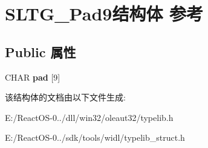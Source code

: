 \hypertarget{struct_s_l_t_g___pad9}{}\section{S\+L\+T\+G\+\_\+\+Pad9结构体 参考}
\label{struct_s_l_t_g___pad9}
\subsection*{Public 属性}
\begin{DoxyCompactItemize}
\item 
\mbox{\label{struct_s_l_t_g___pad9_a969ead70a72c3499d835c15a84177308}} 
C\+H\+AR {\bfseries pad} \mbox{[}9\mbox{]}
\end{DoxyCompactItemize}


该结构体的文档由以下文件生成\+:\begin{DoxyCompactItemize}
\item 
E\+:/\+React\+O\+S-\/0../dll/win32/oleaut32/typelib.\+h\item 
E\+:/\+React\+O\+S-\/0../sdk/tools/widl/typelib\+\_\+struct.\+h\end{DoxyCompactItemize}
